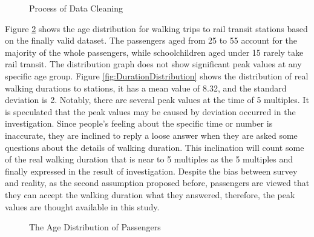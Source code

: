 \documentclass[sustainability,article,submit,moreauthors,pdftex,10pt,a4paper]{Definitions/mdpi}
\begin{document}
%
\begin{figure}[h]
	\caption{Process of Data Cleaning}
	\label{fig:DataCleaning}
	\centering
\end{figure}

%
Figure \ref{fig:AgeDistribution} shows the age distribution for walking trips to rail transit stations based on the finally valid dataset. The passengers aged from 25 to 55 account for the majority of the whole passengers, while schoolchildren aged under 15 rarely take rail transit. The distribution graph does not show significant peak values at any specific age group. Figure \ref{fig:DurationDistribution} shows the distribution of real walking durations to stations, it has a mean value of 8.32, and the standard deviation is 2. Notably, there are several peak values at the time of 5 multiples. It is speculated that the peak values may be caused by deviation occurred in the investigation. Since people's feeling about the specific time or number is inaccurate, they are inclined to reply a loose answer when they are asked some questions about the details of walking duration. This inclination will count some of the real walking duration that is near to 5 multiples as the 5 multiples and finally expressed in the result of investigation. Despite the bias between survey and reality, as the second assumption proposed before, passengers are viewed that they can accept the walking duration what they answered, therefore, the peak values are thought available in this study.

%
\begin{figure}[h]
	\caption{The Age Distribution of Passengers}
	\label{fig:AgeDistribution}
	\centering
\end{figure}
\end{document}

